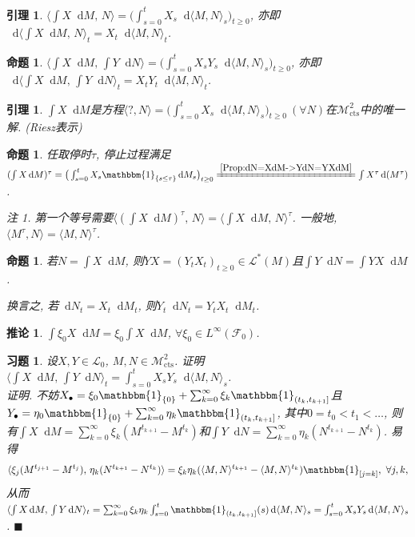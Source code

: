 \documentclass{ctexart}
\theoremstyle{definition}
\theoremstyle{remark}
\newtheorem{Rmk}[Def]{注}
\theoremstyle{plain}
\newtheorem{Prop}[Def]{命题}
\newtheorem{Lem}[Def]{引理}
\newtheorem{Cor}[Def]{推论}
\newtheorem{Ex}{习题}[section]
\newenvironment{Prf}{\vspace{1ex}\textbf{\\}{\color{red}\textit{证明}}.\normalfont}{\color{red}\hfill$\blacksquare$\vspace{1ex}\par}
\newcommand{\1}{\mathbbm{1}}				%
\newcommand{\agp}[1]{\langle #1 \rangle}	%
\newcommand{\tint}{\textstyle\int\nolimits}
\newcommand{\tsum}{\textstyle\sum\nolimits}
\renewcommand*{\d}{\mathop{}\!\mathrm{d}}	%
\begin{document}
\begin{Lem}
$\agp{\int X \d M ,\, N} = \big(\tint_{s=0}^{t} X_{s} \d\agp{M,N}_{s} \big)_{t \ge 0}$, 亦即$\d\agp{\int X \d M ,\, N}_{t} = X_{t} \d\agp{M,N}_{t}$.
\end{Lem}

\begin{Prop}
$\agp{\int X \d M ,\, \int Y \d N} = \big(\tint_{s=0}^{t} X_{s}Y_{s} \d\agp{M,N}_{s} \big)_{t \ge 0}$, 亦即$\d\agp{\int X \d M ,\, \int Y \d N}_{t} = X_{t}Y_{t} \d\agp{M,N}_{t}$.
\end{Prop}

\begin{Lem}
$\int X \d M$是方程$\agp{?,N} = \big(\tint_{s=0}^{t} X_{s} \d\agp{M,N}_{s} \big)_{t \ge 0} \ (\forall N)$在$\mathcal{M}^{2}_{\mathrm{cts}}$中的唯一解.
\hfill\normalfont (Riesz表示)
\end{Lem}

\begin{Prop}
任取停时$\tau$, 停止过程满足$(\int X \d M)^{\tau} = \big(\int_{s=0}^{t} X_{s} \1_{\{s\le\tau\}} \d M_{s}\big)_{t \ge 0} \xlongequal{\ref{Prop:dN=XdM->YdN=YXdM}} \int X^{\tau} \d (M^{\tau})$.
\begin{Rmk}
第一个等号需要$\agp{(\int X \d M)^{\tau} ,\, N} = \agp{\int X \d M ,\, N}^{\tau}$. 一般地, $\agp{M^{\tau},N} = \agp{M,N}^{\tau}$.
\end{Rmk}
\end{Prop}

\begin{Prop}\label{Prop:dN=XdM->YdN=YXdM}
若$N = \int X \d M$, 则$YX = (Y_{t}X_{t})_{t \ge 0} \in \mathcal{L}^{*}(M)$且$\int Y \d N = \int YX \d M$.
\par 换言之, 若$\d N_{t} = X_{t} \d M_{t}$, 则$Y_{t} \d N_{t} = Y_{t}X_{t} \d M_{t}$.
\end{Prop}
\begin{Cor}
$\int \xi_{0} X \d M = \xi_{0} \int X \d M$, $\forall \xi_{0} \in L^{\infty}(\mathscr{F}_{0})$.
\end{Cor}


\begin{Ex}
设$X,Y\in\mathcal{L}_{0}$, $M,N\in\mathcal{M}^{2}_{\mathrm{cts}}$. 证明$\agp{\int X \d M ,\, \int Y \d N}_{t} = \int_{s=0}^{t} X_{s}Y_{s} \d\agp{M,N}_{s}$.
\begin{Prf}
不妨$X_{\bullet} = \xi_{0} \1_{\{0\}} + \tsum_{k=0}^{\infty} \xi_{k} \1_{(t_{k},t_{k+1}]}$且$Y_{\bullet} = \eta_{0} \1_{\{0\}} + \tsum_{k=0}^{\infty} \eta_{k} \1_{(t_{k},t_{k+1}]}$, 其中$0 = t_{0} < t_{1} < \dots$, 则有$\tint X \d M = \tsum_{k=0}^{\infty} \xi_{k} (M^{t_{k+1}} - M^{t_{k}})$和$\tint Y \d N = \tsum_{k=0}^{\infty} \eta_{k} (N^{t_{k+1}} - N^{t_{k}})$. 易得
\[ \agp{\xi_{j}(M^{t_{j+1}}-M^{t_{j}}) ,\, \eta_{k}(N^{t_{k+1}}-N^{t_{k}})} = \xi_{k}\eta_{k} (\agp{M,N}^{t_{k+1}}-\agp{M,N}^{t_{k}}) \1_{[j=k]} , \ \forall j,k, \]
从而$\agp{\int X \d M ,\, \int Y \d N}_{t} = \tsum_{k=0}^{\infty} \xi_{k}\eta_{k} \int_{s=0}^{t} \1_{(t_{k},t_{k+1}]}(s) \d\agp{M,N}_{s} = \int_{s=0}^{t} X_{s}Y_{s} \d\agp{M,N}_{s}$.
\end{Prf}
\end{Ex}
\end{document}
